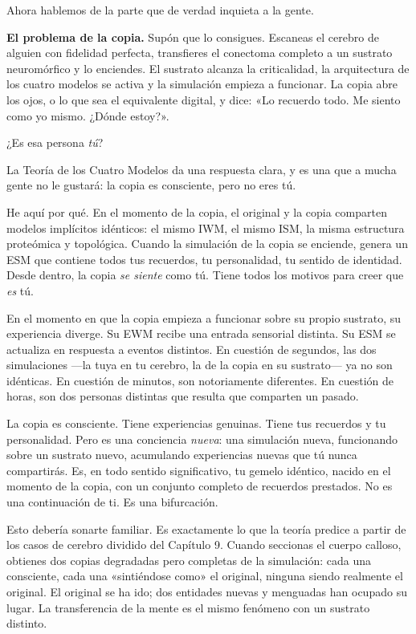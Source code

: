\documentclass[11pt, twoside, openright]{book}
\begin{document}
Ahora hablemos de la parte que de verdad inquieta a la gente.

\textbf{El problema de la copia.} Supón que lo consigues. Escaneas el cerebro de alguien con fidelidad perfecta, transfieres el conectoma completo a un sustrato neuromórfico y lo enciendes. El sustrato alcanza la criticalidad, la arquitectura de los cuatro modelos se activa y la simulación empieza a funcionar. La copia abre los ojos, o lo que sea el equivalente digital, y dice: «Lo recuerdo todo. Me siento como yo mismo. ¿Dónde estoy?».

¿Es esa persona \textit{tú}?

La Teoría de los Cuatro Modelos da una respuesta clara, y es una que a mucha gente no le gustará: la copia es consciente, pero no eres tú.

He aquí por qué. En el momento de la copia, el original y la copia comparten modelos implícitos idénticos: el mismo IWM, el mismo ISM, la misma estructura proteómica y topológica. Cuando la simulación de la copia se enciende, genera un ESM que contiene todos tus recuerdos, tu personalidad, tu sentido de identidad. Desde dentro, la copia \textit{se siente} como tú. Tiene todos los motivos para creer que \textit{es} tú.

En el momento en que la copia empieza a funcionar sobre su propio sustrato, su experiencia diverge. Su EWM recibe una entrada sensorial distinta. Su ESM se actualiza en respuesta a eventos distintos. En cuestión de segundos, las dos simulaciones ---la tuya en tu cerebro, la de la copia en su sustrato--- ya no son idénticas. En cuestión de minutos, son notoriamente diferentes. En cuestión de horas, son dos personas distintas que resulta que comparten un pasado.

La copia es consciente. Tiene experiencias genuinas. Tiene tus recuerdos y tu personalidad. Pero es una conciencia \textit{nueva}: una simulación nueva, funcionando sobre un sustrato nuevo, acumulando experiencias nuevas que tú nunca compartirás. Es, en todo sentido significativo, tu gemelo idéntico, nacido en el momento de la copia, con un conjunto completo de recuerdos prestados. No es una continuación de ti. Es una bifurcación.

Esto debería sonarte familiar. Es exactamente lo que la teoría predice a partir de los casos de cerebro dividido del Capítulo 9. Cuando seccionas el cuerpo calloso, obtienes dos copias degradadas pero completas de la simulación: cada una consciente, cada una «sintiéndose como» el original, ninguna siendo realmente el original. El original se ha ido; dos entidades nuevas y menguadas han ocupado su lugar. La transferencia de la mente es el mismo fenómeno con un sustrato distinto.
\end{document}
